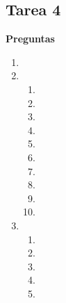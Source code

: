 \documentclass{report}
\begin{document}
	
	
	
	\begin{center}
		\section*{\LARGE{Tarea 4}}
	\end{center}

    \begin{center}
        \LARGE{\textbf{Preguntas}}\\
    \end{center}
    \normalsize
    
    \begin{enumerate}%
        \item 
        \item    
        \begin{enumerate}[label=\alph*.]
            \item  
            \item 
            \item 
            \item 
            \item 
            \item 
            \item 
            \item 
            \item 
            \item 
        \end{enumerate}
        \item 
        \begin{enumerate}[label=\alph*.]
            \item  
            \item 
            \item 
            \item 
            \item 
        \end{enumerate}
    \end{enumerate}
    \newpage
    
  
\end{document}

